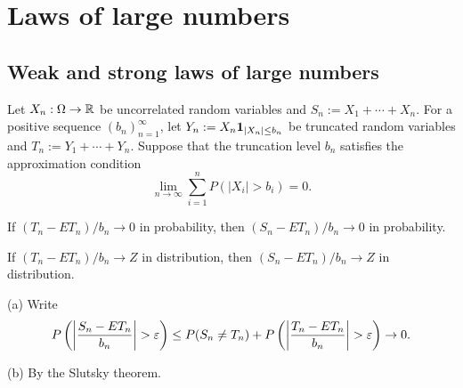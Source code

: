 \documentclass{../note}
\begin{document}
\chapter{Laws of large numbers}

\section{Weak and strong laws of large numbers}



\begin{prb}
Let $X_n:\Omega\to\mathbb{R}$ be uncorrelated random variables and $S_n:=X_1+\cdots+X_n$.
For a positive sequence $(b_n)_{n=1}^\infty$, let $Y_n:=X_n\mathbf{1}_{|X_n|\le b_n}$ be truncated random variables and $T_n:=Y_1+\cdots+Y_n$.
Suppose that the truncation level $b_n$ satisfies the approximation condition
\[\lim_{n\to\infty}\sum_{i=1}^nP(|X_i|>b_i)=0.\]
\begin{parts}
\item If $(T_n-ET_n)/b_n\to0$ in probability, then $(S_n-ET_n)/b_n\to0$ in probability.
\item If $(T_n-ET_n)/b_n\to Z$ in distribution, then $(S_n-ET_n)/b_n\to Z$ in distribution.
\end{parts}
\end{prb}
\begin{pf}
(a)
Write
\[P\left(\left|\frac{S_n-ET_n}{b_n}\right|>\e\right)
\le P(S_n\ne T_n)+P\left(\left|\frac{T_n-ET_n}{b_n}\right|>\e\right)\to0.\]

(b)
By the Slutsky theorem.
\end{pf}
\end{document}
